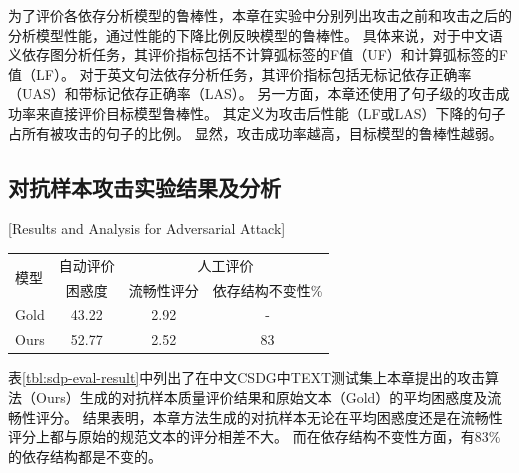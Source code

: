 为了评价各依存分析模型的鲁棒性，本章在实验中分别列出攻击之前和攻击之后的分析模型性能，通过性能的下降比例反映模型的鲁棒性。
具体来说，对于中文语义依存图分析任务，其评价指标包括不计算弧标签的F值（UF）和计算弧标签的F值（LF）。
对于英文句法依存分析任务，其评价指标包括无标记依存正确率（UAS）和带标记依存正确率（LAS）。
另一方面，本章还使用了句子级的攻击成功率来直接评价目标模型鲁棒性。
其定义为攻击后性能（LF或LAS）下降的句子占所有被攻击的句子的比例。
显然，攻击成功率越高，目标模型的鲁棒性越弱。


\subsection{对抗样本攻击实验结果及分析}[Results and Analysis for Adversarial Attack]
\label{sec:chapter3-results}

\begin{table}[htbp]
    \vspace{0.5em}\centering\wuhao
	\begin{tabular}{lccc}
		\toprule[1.5pt]
		\multirow{2}{*}{模型}& 自动评价 & \multicolumn{2}{c}{人工评价} \\
		\cmidrule(r){2-2} \cmidrule(r){3-4}
		& 困惑度 &  流畅性评分 & 依存结构不变性\%  \\
		\midrule[1pt]
		Gold & 43.22 & 2.92 & - \\
		Ours & 52.77 & 2.52 & 83  \\
		\bottomrule[1.5pt]
	\end{tabular}
\end{table}

表\ref{tbl:sdp-eval-result}中列出了在中文CSDG中TEXT测试集上本章提出的攻击算法（Ours）生成的对抗样本质量评价结果和原始文本（Gold）的平均困惑度及流畅性评分。
结果表明，本章方法生成的对抗样本无论在平均困惑度还是在流畅性评分上都与原始的规范文本的评分相差不大。
而在依存结构不变性方面，有83\%的依存结构都是不变的。

